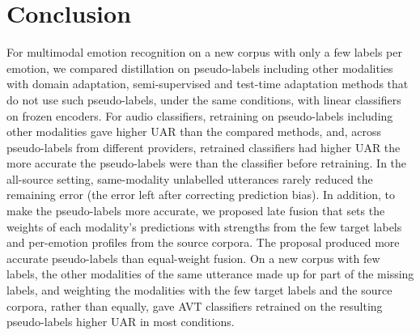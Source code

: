 \section{Conclusion}\label{sec:conclusion}

For multimodal emotion recognition on a new corpus with only a few labels per emotion, we compared distillation on pseudo-labels including other modalities with domain adaptation, semi-supervised and test-time adaptation methods that do not use such pseudo-labels, under the same conditions, with linear classifiers on frozen encoders. For audio classifiers, retraining on pseudo-labels including other modalities gave higher UAR than the compared methods, and, across pseudo-labels from different providers, retrained classifiers had higher UAR the more accurate the pseudo-labels were than the classifier before retraining. In the all-source setting, same-modality unlabelled utterances rarely reduced the remaining error (the error left after correcting prediction bias). In addition, to make the pseudo-labels more accurate, we proposed late fusion that sets the weights of each modality's predictions with strengths from the few target labels and per-emotion profiles from the source corpora. The proposal produced more accurate pseudo-labels than equal-weight fusion. On a new corpus with few labels, the other modalities of the same utterance made up for part of the missing labels, and weighting the modalities with the few target labels and the source corpora, rather than equally, gave AVT classifiers retrained on the resulting pseudo-labels higher UAR in most conditions.
